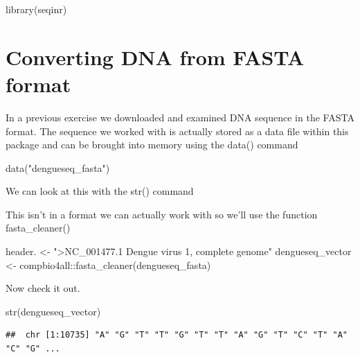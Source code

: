 \documentclass[
]{book}
\newenvironment{Shaded}{\begin{snugshade}}{\end{snugshade}}
\newcommand{\FunctionTok}[1]{\textcolor[rgb]{0.00,0.00,0.00}{#1}}
\newcommand{\NormalTok}[1]{#1}
\newcommand{\OtherTok}[1]{\textcolor[rgb]{0.56,0.35,0.01}{#1}}
\newcommand{\SpecialCharTok}[1]{\textcolor[rgb]{0.00,0.00,0.00}{#1}}
\newcommand{\StringTok}[1]{\textcolor[rgb]{0.31,0.60,0.02}{#1}}
\begin{document}
\begin{Shaded}
\begin{Highlighting}[]
\FunctionTok{library}\NormalTok{(seqinr)}
\end{Highlighting}
\end{Shaded}

\hypertarget{converting-dna-from-fasta-format}{%
\section{Converting DNA from FASTA format}\label{converting-dna-from-fasta-format}}

In a previous exercise we downloaded and examined DNA sequence in the FASTA format. The sequence we worked with is actually stored as a data file within this package and can be brought into memory using the data() command

\begin{Shaded}
\begin{Highlighting}[]
\FunctionTok{data}\NormalTok{(}\StringTok{"dengueseq\_fasta"}\NormalTok{)}
\end{Highlighting}
\end{Shaded}

We can look at this with the str() command

This isn't in a format we can actually work with so we'll use the function fasta\_cleaner()

\begin{Shaded}
\begin{Highlighting}[]
\NormalTok{header. }\OtherTok{\textless{}{-}} \StringTok{"\textgreater{}NC\_001477.1 Dengue virus 1, complete genome"}
\NormalTok{dengueseq\_vector }\OtherTok{\textless{}{-}}\NormalTok{ compbio4all}\SpecialCharTok{::}\FunctionTok{fasta\_cleaner}\NormalTok{(dengueseq\_fasta)}
\end{Highlighting}
\end{Shaded}

Now check it out.

\begin{Shaded}
\begin{Highlighting}[]
\FunctionTok{str}\NormalTok{(dengueseq\_vector)}
\end{Highlighting}
\end{Shaded}

\begin{verbatim}
##  chr [1:10735] "A" "G" "T" "T" "G" "T" "T" "A" "G" "T" "C" "T" "A" "C" "G" ...
\end{verbatim}
\end{document}
